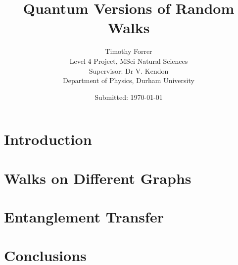 \documentclass[12pt, onecolumn]{article}
\begin{document}
\title{\bf{Quantum Versions of Random Walks}} 
\date{Submitted: \today{}}
\author{
    Timothy Forrer\\
    Level 4 Project, MSci Natural Sciences\\
    Supervisor: Dr V. Kendon\\
    Department of Physics, Durham University}

\maketitle



\tableofcontents

\newpage

\section{Introduction} 


\section{Walks on Different Graphs}


\section{Entanglement Transfer}


\section{Conclusions}




\printbibliography


\end{document}
